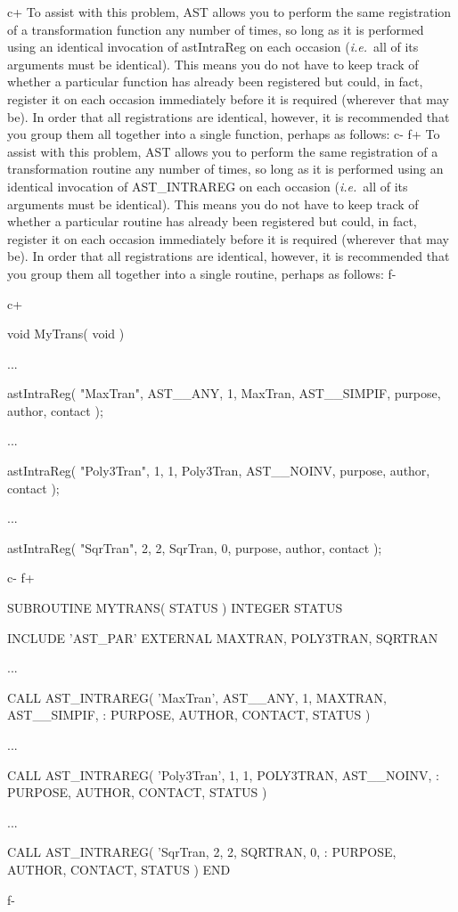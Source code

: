 \documentclass[twoside,11pt]{starlink}
\begin{document}
c+
To assist with this problem, AST allows you to perform the same
registration of a transformation function any number of times, so long
as it is performed using an identical invocation of astIntraReg on
each occasion (\emph{i.e.}\ all of its arguments must be
identical). This means you do not have to keep track of whether a
particular function has already been registered but could, in fact,
register it on each occasion immediately before it is required
(wherever that may be). In order that all registrations are identical,
however, it is recommended that you group them all together into a
single function, perhaps as follows:
c-
f+
To assist with this problem, AST allows you to perform the same
registration of a transformation routine any number of times, so long
as it is performed using an identical invocation of AST\_INTRAREG on
each occasion (\emph{i.e.}\ all of its arguments must be
identical). This means you do not have to keep track of whether a
particular routine has already been registered but could, in fact,
register it on each occasion immediately before it is required
(wherever that may be). In order that all registrations are identical,
however, it is recommended that you group them all together into a
single routine, perhaps as follows:
f-

c+
\small
\begin{terminalv}
void MyTrans( void ) {

   ...

   astIntraReg( "MaxTran", AST__ANY, 1, MaxTran, AST__SIMPIF,
                purpose, author, contact );

   ...

   astIntraReg( "Poly3Tran", 1, 1, Poly3Tran, AST__NOINV,
                purpose, author, contact );

   ...

   astIntraReg( "SqrTran", 2, 2, SqrTran, 0,
                purpose, author, contact );
}
\end{terminalv}
\normalsize
c-
f+
\small
\begin{terminalv}
      SUBROUTINE MYTRANS( STATUS )
      INTEGER STATUS

      INCLUDE 'AST_PAR'
      EXTERNAL MAXTRAN, POLY3TRAN, SQRTRAN

      ...

      CALL AST_INTRAREG( 'MaxTran', AST__ANY, 1, MAXTRAN, AST__SIMPIF,
     :                   PURPOSE, AUTHOR, CONTACT, STATUS )

      ...

      CALL AST_INTRAREG( 'Poly3Tran', 1, 1, POLY3TRAN, AST__NOINV,
     :                   PURPOSE, AUTHOR, CONTACT, STATUS )

      ...

      CALL AST_INTRAREG( 'SqrTran, 2, 2, SQRTRAN, 0,
     :                   PURPOSE, AUTHOR, CONTACT, STATUS )
      END
\end{terminalv}
\normalsize
f-
\end{document}
